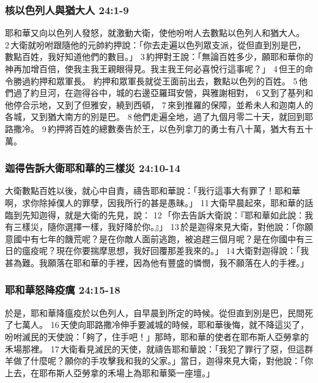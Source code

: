 \subsubsection{核以色列人與猶大人 24:1-9}
耶和華又向以色列人發怒，就激動大衛，使他吩咐人去數點以色列人和猶大人。 2 大衛就吩咐跟隨他的元帥約押說：「你去走遍以色列眾支派，從但直到別是巴，數點百姓，我好知道他們的數目。」 3 約押對王說：「無論百姓多少，願耶和華你的神再加增百倍，使我主我王親眼得見。我主我王何必喜悅行這事呢？」 4 但王的命令勝過約押和眾軍長。
約押和眾軍長就從王面前出去，數點以色列的百姓。 5 他們過了約旦河，在迦得谷中，城的右邊亞羅珥安營，與雅謝相對， 6 又到了基列和他停合示地，又到了但雅安，繞到西頓， 7 來到推羅的保障，並希未人和迦南人的各城，又到猶大南方的別是巴。 8 他們走遍全地，過了九個月零二十天，就回到耶路撒冷。 9 約押將百姓的總數奏告於王，以色列拿刀的勇士有八十萬，猶大有五十萬。

\subsubsection{迦得告訴大衛耶和華的三樣災 24:10-14}
大衛數點百姓以後，就心中自責，禱告耶和華說：「我行這事大有罪了！耶和華啊，求你除掉僕人的罪孽，因我所行的甚是愚昧。」 11 大衛早晨起來，耶和華的話臨到先知迦得，就是大衛的先見，說： 12 「你去告訴大衛說：『耶和華如此說：我有三樣災，隨你選擇一樣，我好降於你。』」 13 於是迦得來見大衛，對他說：「你願意國中有七年的饑荒呢？是在你敵人面前逃跑，被追趕三個月呢？是在你國中有三日的瘟疫呢？現在你要揣摩思想，我好回覆那差我來的。」 14 大衛對迦得說：「我甚為難。我願落在耶和華的手裡，因為他有豐盛的憐憫，我不願落在人的手裡。」

\subsubsection{耶和華怒降疫癘 24:15-18}
於是，耶和華降瘟疫於以色列人，自早晨到所定的時候。從但直到別是巴，民間死了七萬人。 16 天使向耶路撒冷伸手要滅城的時候，耶和華後悔，就不降這災了，吩咐滅民的天使說：「夠了，住手吧！」那時，耶和華的使者在耶布斯人亞勞拿的禾場那裡。 17 大衛看見滅民的天使，就禱告耶和華說：「我犯了罪行了惡，但這群羊做了什麼呢？願你的手攻擊我和我的父家。」當日，迦得來見大衛，對他說：「你上去，在耶布斯人亞勞拿的禾場上為耶和華築一座壇。」


